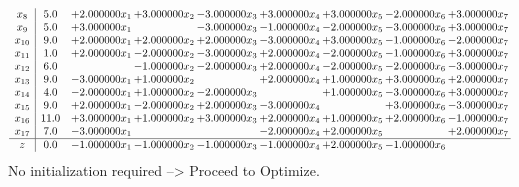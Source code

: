 \documentclass[10pt]{article}
\begin{document}
\[\begin{array}{c| c c@{\hskip 2pt} c@{\hskip 2pt} c@{\hskip 2pt} c@{\hskip 2pt} c@{\hskip 2pt} c@{\hskip 2pt} c@{\hskip 2pt} }
 x_{8}   &  5.0 & + 2.000000 x_{1} & + 3.000000 x_{2} & -3.000000 x_{3} & + 3.000000 x_{4} & + 3.000000 x_{5} & -2.000000 x_{6} & + 3.000000 x_{7}\\
 x_{9}   &  5.0 & + 3.000000 x_{1} &   & -3.000000 x_{3} & -1.000000 x_{4} & -2.000000 x_{5} & -3.000000 x_{6} & + 3.000000 x_{7}\\
 x_{10}   &  9.0 & + 2.000000 x_{1} & + 2.000000 x_{2} & + 2.000000 x_{3} & -3.000000 x_{4} & + 3.000000 x_{5} & -1.000000 x_{6} & -2.000000 x_{7}\\
 x_{11}   &  1.0 & + 2.000000 x_{1} & -2.000000 x_{2} & -3.000000 x_{3} & + 2.000000 x_{4} & -2.000000 x_{5} & -1.000000 x_{6} & + 3.000000 x_{7}\\
 x_{12}   &  6.0  &   & -1.000000 x_{2} & -2.000000 x_{3} & + 2.000000 x_{4} & -2.000000 x_{5} & -2.000000 x_{6} & -3.000000 x_{7}\\
 x_{13}   &  9.0 & -3.000000 x_{1} & + 1.000000 x_{2} &   & + 2.000000 x_{4} & + 1.000000 x_{5} & + 3.000000 x_{6} & + 2.000000 x_{7}\\
 x_{14}   &  4.0 & -2.000000 x_{1} & + 1.000000 x_{2} & -2.000000 x_{3} &   & + 1.000000 x_{5} & -3.000000 x_{6} & + 3.000000 x_{7}\\
 x_{15}   &  9.0 & + 2.000000 x_{1} & -2.000000 x_{2} & + 2.000000 x_{3} & -3.000000 x_{4} &   & + 3.000000 x_{6} & -3.000000 x_{7}\\
 x_{16}   &  11.0 & + 3.000000 x_{1} & + 1.000000 x_{2} & + 3.000000 x_{3} & + 2.000000 x_{4} & + 1.000000 x_{5} & + 2.000000 x_{6} & -1.000000 x_{7}\\
 x_{17}   &  7.0 & -3.000000 x_{1} &    &   & -2.000000 x_{4} & + 2.000000 x_{5} &   & + 2.000000 x_{7}\\
\hline
z    &  0.0 & -1.000000 x_{1} & -1.000000 x_{2} & -1.000000 x_{3} & -1.000000 x_{4} & + 2.000000 x_{5} & -1.000000 x_{6} &   \\
\end{array}\]
No initialization required --> Proceed to Optimize. 
\end{document}
